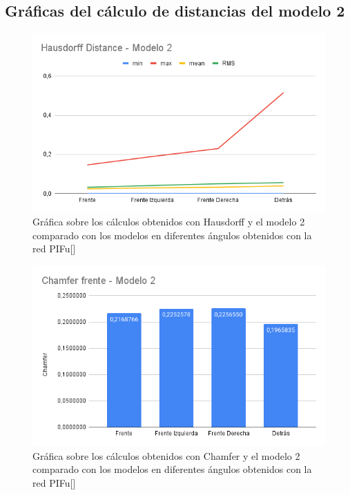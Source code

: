 \subsection{Gráficas del cálculo de distancias del modelo 2}
\begin{figure}[H]
	\centering
	\includegraphics[scale=0.55]{imagenes/Hausdorff-M2.png}
	\caption{Gráfica sobre los cálculos obtenidos con Hausdorff y el modelo 2 comparado con los modelos en diferentes ángulos obtenidos con la red PIFu[\cite{pifu}]}
	\label{fig:figura16}
\end{figure}

\begin{figure}[H]
	\centering
	\includegraphics[scale=0.55]{imagenes/Chamfer-M2.png}
	\caption{Gráfica sobre los cálculos obtenidos con Chamfer y el modelo 2 comparado con los modelos en diferentes ángulos obtenidos con la red PIFu[\cite{pifu}]}
	\label{fig:figura17}
\end{figure}
